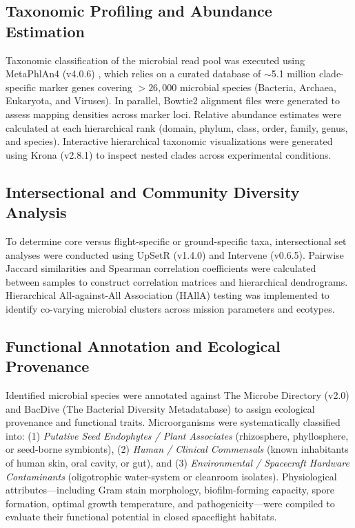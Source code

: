 \subsection{Taxonomic Profiling and Abundance Estimation}
Taxonomic classification of the microbial read pool was executed using MetaPhlAn4 (v4.0.6) \citep{segata2012metagenomic}, which relies on a curated database of $\sim$5.1 million clade-specific marker genes covering $>26,000$ microbial species (Bacteria, Archaea, Eukaryota, and Viruses). In parallel, Bowtie2 alignment files were generated to assess mapping densities across marker loci. Relative abundance estimates were calculated at each hierarchical rank (domain, phylum, class, order, family, genus, and species). Interactive hierarchical taxonomic visualizations were generated using Krona (v2.8.1) \citep{ondov2011interactive} to inspect nested clades across experimental conditions.

\subsection{Intersectional and Community Diversity Analysis}
To determine core versus flight-specific or ground-specific taxa, intersectional set analyses were conducted using UpSetR (v1.4.0) \citep{conway2017upsetr} and Intervene (v0.6.5). Pairwise Jaccard similarities and Spearman correlation coefficients were calculated between samples to construct correlation matrices and hierarchical dendrograms. Hierarchical All-against-All Association (HAllA) testing was implemented to identify co-varying microbial clusters across mission parameters and ecotypes.

\subsection{Functional Annotation and Ecological Provenance}
Identified microbial species were annotated against The Microbe Directory (v2.0) and BacDive (The Bacterial Diversity Metadatabase) to assign ecological provenance and functional traits. Microorganisms were systematically classified into: (1) \textit{Putative Seed Endophytes / Plant Associates} (rhizosphere, phyllosphere, or seed-borne symbionts), (2) \textit{Human / Clinical Commensals} (known inhabitants of human skin, oral cavity, or gut), and (3) \textit{Environmental / Spacecraft Hardware Contaminants} (oligotrophic water-system or cleanroom isolates). Physiological attributes—including Gram stain morphology, biofilm-forming capacity, spore formation, optimal growth temperature, and pathogenicity—were compiled to evaluate their functional potential in closed spaceflight habitats.
